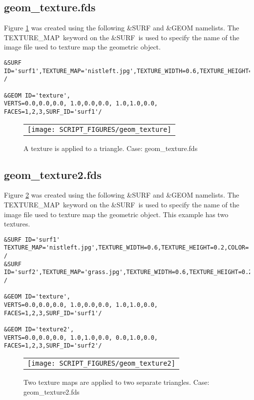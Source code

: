 \documentclass[12pt]{article}
\begin{document}
\subsection{geom\_texture.fds}
Figure \ref{fig:geom_texture} was created using the following \&SURF and \&GEOM namelists.
The {\ct TEXTURE\_MAP}\ keyword on the {\ct \&SURF}\ is used to specify the name of the image
file used to texture map the geometric object.

{\small
\begin{verbatim}
&SURF ID='surf1',TEXTURE_MAP='nistleft.jpg',TEXTURE_WIDTH=0.6,TEXTURE_HEIGHT=0.2,COLOR='BLUE' /

&GEOM ID='texture',
VERTS=0.0,0.0,0.0, 1.0,0.0,0.0, 1.0,1.0,0.0,
FACES=1,2,3,SURF_ID='surf1'/
\end{verbatim}
}

\begin{figure}[\figoptions]
\begin{center}
\begin{tabular}{c}
 \texttt{[image: SCRIPT\_FIGURES/geom\_texture]}
  \end{tabular}
\end{center}
 \caption{A texture is applied to a triangle. Case: geom\_texture.fds}
\label{fig:geom_texture}
\end{figure}

\subsection{geom\_texture2.fds}
Figure \ref{fig:geom_texture2} was created using the following \&SURF and \&GEOM namelists.
The {\ct TEXTURE\_MAP}\ keyword on the {\ct \&SURF}\ is used to specify the name of the image
file used to texture map the geometric object. This example has two textures.

{\small
\begin{verbatim}
&SURF ID='surf1' TEXTURE_MAP='nistleft.jpg',TEXTURE_WIDTH=0.6,TEXTURE_HEIGHT=0.2,COLOR='BLUE' /
&SURF ID='surf2',TEXTURE_MAP='grass.jpg',TEXTURE_WIDTH=0.6,TEXTURE_HEIGHT=0.2,COLOR='GREEN' /

&GEOM ID='texture',
VERTS=0.0,0.0,0.0, 1.0,0.0,0.0, 1.0,1.0,0.0,
FACES=1,2,3,SURF_ID='surf1'/

&GEOM ID='texture2',
VERTS=0.0,0.0,0.0, 1.0,1.0,0.0, 0.0,1.0,0.0,
FACES=1,2,3,SURF_ID='surf2'/
\end{verbatim}
}

\begin{figure}[\figoptions]
\begin{center}
\begin{tabular}{c}
 \texttt{[image: SCRIPT\_FIGURES/geom\_texture2]}
  \end{tabular}
\end{center}
 \caption{Two texture maps are applied to two separate triangles.  Case: geom\_texture2.fds}
\label{fig:geom_texture2}
\end{figure}
\end{document}
